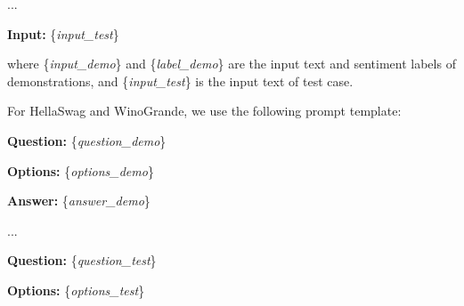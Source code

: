 \documentclass[11pt]{article}
\begin{document}
...

\textbf{Input: }\{\textit{input\_test}\}

\noindent where \{\textit{input\_demo}\} and \{\textit{label\_demo}\} are the input text and sentiment labels of demonstrations, and \{\textit{input\_test}\} is the input text of test case.

For HellaSwag and WinoGrande, we use the following prompt template:

\textbf{Question:} \{\textit{question\_demo}\}

\textbf{Options:} \{\textit{options\_demo}\}

\textbf{Answer:} \{\textit{answer\_demo}\}

...

\textbf{Question:} \{\textit{question\_test}\}

\textbf{Options:} \{\textit{options\_test}\}
\end{document}
